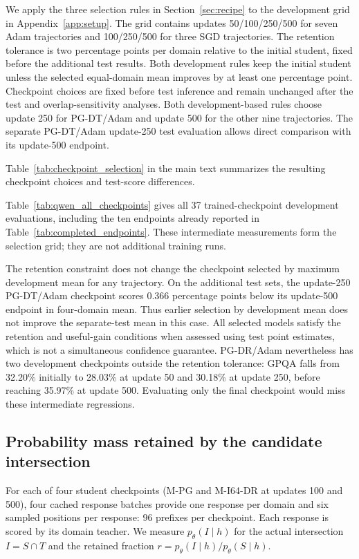 We apply the three selection rules in Section~\ref{sec:recipe} to the development grid in Appendix~\ref{app:setup}. The grid contains updates 50/100/250/500 for seven Adam trajectories and 100/250/500 for three SGD trajectories. The retention tolerance is two percentage points per domain relative to the initial student, fixed before the additional test results. Both development rules keep the initial student unless the selected equal-domain mean improves by at least one percentage point. Checkpoint choices are fixed before test inference and remain unchanged after the test and overlap-sensitivity analyses. Both development-based rules choose update 250 for PG-DT/Adam and update 500 for the other nine trajectories. The separate PG-DT/Adam update-250 test evaluation allows direct comparison with its update-500 endpoint.

Table~\ref{tab:checkpoint_selection} in the main text summarizes the resulting checkpoint choices and test-score differences.

Table~\ref{tab:qwen_all_checkpoints} gives all 37 trained-checkpoint development evaluations, including the ten endpoints already reported in Table~\ref{tab:completed_endpoints}. These intermediate measurements form the selection grid; they are not additional training runs.


The retention constraint does not change the checkpoint selected by maximum development mean for any trajectory. On the additional test sets, the update-250 PG-DT/Adam checkpoint scores 0.366 percentage points below its update-500 endpoint in four-domain mean. Thus earlier selection by development mean does not improve the separate-test mean in this case. All selected models satisfy the retention and useful-gain conditions when assessed using test point estimates, which is not a simultaneous confidence guarantee. PG-DR/Adam nevertheless has two development checkpoints outside the retention tolerance: GPQA falls from 32.20\% initially to 28.03\% at update 50 and 30.18\% at update 250, before reaching 35.97\% at update 500. Evaluating only the final checkpoint would miss these intermediate regressions.

\subsection{Probability mass retained by the candidate intersection}
\label{app:actual_intersection_coverage}

For each of four student checkpoints (M-PG and M-I64-DR at updates 100 and 500), four cached response batches provide one response per domain and six sampled positions per response: 96 prefixes per checkpoint. Each response is scored by its domain teacher. We measure $p_\theta(I\mid h)$ for the actual intersection $I=S\cap T$ and the retained fraction $r=p_\theta(I\mid h)/p_\theta(S\mid h)$.

